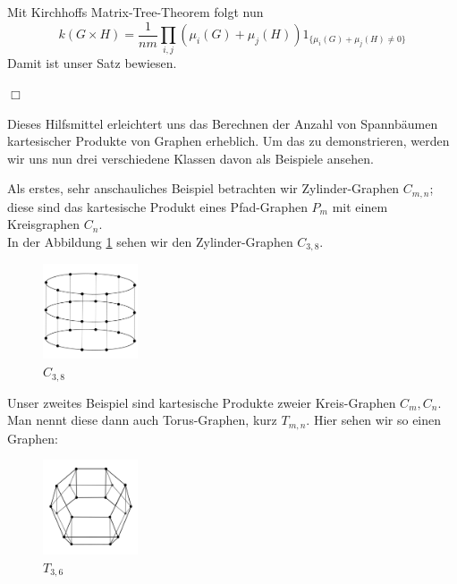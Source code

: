 Mit Kirchhoffs Matrix-Tree-Theorem folgt nun
\begin{equation}
 \mathit{k}(G \times H) = \frac{1}{nm}\displaystyle\prod_{i,j}(\mu_i(G)+\mu_j(H))1_{\{\mu_i(G)+\mu_j(H)\neq0\}}
\end{equation}
Damit ist unser Satz bewiesen.
\begin{flushright} $\Box$ \end{flushright} 
Dieses Hilfsmittel erleichtert uns das Berechnen der Anzahl von Spannbäumen kartesischer Produkte von Graphen erheblich. Um das zu demonstrieren, werden wir uns nun drei verschiedene Klassen davon als Beispiele ansehen.

\begin{Bsps}
\end{Bsps}
Als erstes, sehr anschauliches Beispiel betrachten wir Zylinder-Graphen $C_{m,n}$;
diese sind das kartesische Produkt eines Pfad-Graphen $P_m$ mit einem Kreisgraphen $C_n$.\\
In der Abbildung \ref{c8xp3} sehen wir den Zylinder-Graphen $C_{3,8}$.
\begin{figure}[H]
  \centering
 \includegraphics[width=0.25\textwidth]{c8xp3.png}
 \caption{$C_{3,8}$}
 \label{c8xp3} %
\end{figure}
\begin{Bsps}
\end{Bsps}
Unser zweites Beispiel sind kartesische Produkte zweier Kreis-Graphen $C_m,C_n$.\\
Man nennt diese dann auch Torus-Graphen, kurz $T_{m,n}$. Hier sehen wir so einen Graphen:
\begin{figure}[H]
  \centering
 \includegraphics[width=0.25\textwidth]{C3xC6_4.png}
 \caption{$T_{3,6}$}
 \label{c3xc6} %
\end{figure}
